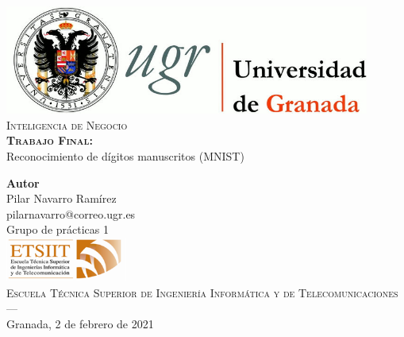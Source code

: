 \begin{titlepage}
 
 
\newlength{\centeroffset}
\setlength{\centeroffset}{-0.5\oddsidemargin}
\addtolength{\centeroffset}{0.5\evensidemargin}
\thispagestyle{empty}

\noindent\hspace*{\centeroffset}\begin{minipage}{\textwidth}

\centering
\includegraphics[width=0.9\textwidth]{img/logo_ugr.jpg}\\[2cm]

\textsc{ \Huge Inteligencia de Negocio\\[1.5cm]}
\textbf{\textsc{ \huge Trabajo Final:}}\\
 \huge  Reconocimiento de dígitos manuscritos (MNIST)\\[1cm]
% 
\end{minipage}

\vspace{2cm}
\noindent\hspace*{\centeroffset}\begin{minipage}{\textwidth}
\centering

\textbf{Autor}\\[0.2cm] {Pilar Navarro Ramírez}\\[0.2cm]
pilarnavarro@correo.ugr.es \\[0.2cm]
Grupo de prácticas 1 \\[1cm]

\includegraphics[width=0.3\textwidth]{img/etsiit_logo.png}\\[0.1cm]
\textsc{Escuela Técnica Superior de Ingeniería Informática y de Telecomunicaciones}\\
\textsc{---}\\
Granada, 2 de febrero de 2021
\end{minipage}
\end{titlepage}



